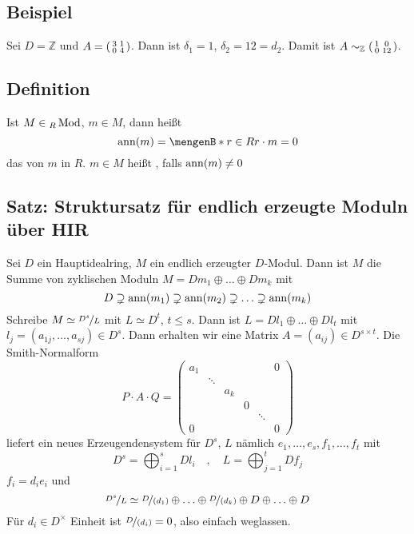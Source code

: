 \subsection[Beispiel: Elementarteilersatz]{Beispiel} %
\label{sub:246}
Sei $D= \mathds{Z}$ und $A = \begin{psmallmatrix}
	3 & 1 \\
	0 & 4
\end{psmallmatrix}$. Dann ist $\delta_1 = 1$, $\delta_2=12= d_2$. Damit ist $A \sim_\mathds{Z} \begin{psmallmatrix}
	1 & 0 \\
	0 & 12
\end{psmallmatrix}$.

\subsection[Definition: Annulatorideal und Torsionselement]{Definition} %
\label{sub:247}
Ist $M \in {_R\Mod}$, $m \in M$, dann heißt 
\[
	\ann(m) = \set[r \in R]{r \cdot m = 0} 
\]
das  von $m$ in $R$. $m \in M$ heißt , falls $\ann(m) \not= 0$  

\subsection{Satz: Struktursatz für endlich erzeugte Moduln über HIR} %
\label{sub:248}
Sei $D$ ein Hauptidealring, $M$ ein endlich erzeugter $D$-Modul. Dann ist $M$ die Summe von zyklischen Moduln $M= D {m_1} \oplus \ldots \oplus D {m_k}$ mit 
\[
	D \supsetneq \ann(m_1) \supsetneq \ann(m_2) \supsetneq \ldots \supsetneq \ann(m_k)
\]
Schreibe $M \simeq \nicefrac{D^s}{L}$ mit $L \simeq D^t$, $t \le s$. Dann ist $L= Dl_1 \oplus \ldots \oplus D l_t$ mit 
$l_j = (a_{1j}, \ldots , a_{sj}) \in D^s$. Dann erhalten wir eine Matrix $A= (a_{ij}) \in D^{s \times t}$. Die Smith-Normalform
\[
	P \cdot A \cdot Q = \begin{pmatrix}
		a_1 & & & & & 0 \\
		& \ddots & & & & \\
		& & a_k & & & \\
		& & & 0 & & \\
		& & && \ddots & \\
		0 & & & & & 0
	\end{pmatrix}
\]
liefert ein neues Erzeugendensystem für $D^s$, $L$ nämlich $e_1, \ldots , e_s, f_1, \ldots , f_t$ mit 
\[
	D^s = \bigoplus_{i=1}^s D{l_i} \quad , \quad L= \bigoplus_{j=1}^t D f_j
\]
$f_i = d_i e_i$ und 
\[
	\nicefrac{D^s}{L} \simeq \nicefrac{D}{(d_1)} \oplus \ldots \oplus \nicefrac{D}{(d_k)} \oplus D \oplus \ldots \oplus D
\]
Für $d_i \in D^\times$ Einheit ist $\nicefrac{D}{(d_i)} = 0$, also einfach weglassen.\bewende

